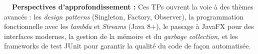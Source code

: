 \documentclass[12pt,a4paper]{report}
\begin{document}
\vspace{0.5cm}

\begin{observationBox}
\textbf{\color{violetInfo}\faEye~~Perspectives d'approfondissement :}
Ces TPs ouvrent la voie à des thèmes avancés : les \textit{design patterns}
(Singleton, Factory, Observer), la programmation fonctionnelle avec les
\textit{lambda} et \textit{Streams} (Java 8+), le passage à JavaFX pour
des interfaces modernes, la gestion de la mémoire et du
\textit{garbage collection}, et les frameworks de test JUnit pour
garantir la qualité du code de façon automatisée.
\end{observationBox}

\vspace{0.8cm}
\end{document}
